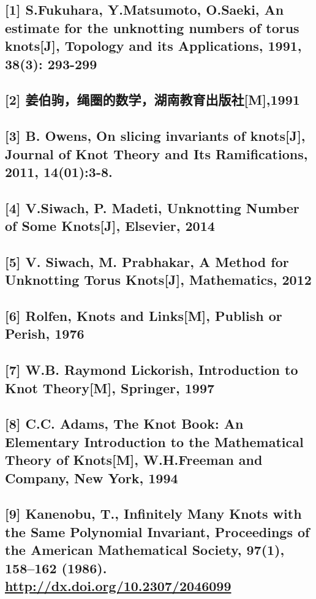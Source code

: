 \documentclass[a4paper]{article}
\begin{document}


\subsection{[1] S.Fukuhara, Y.Matsumoto, O.Saeki, An estimate for the unknotting numbers of torus knots[J], Topology and its Applications, 1991, 38(3): 293-299}
\label{sec:org12adf63}
\subsection{[2] 姜伯驹，绳圈的数学，湖南教育出版社[M],1991}
\label{sec:orgd600c18}
\subsection{[3] B. Owens, On slicing invariants of knots[J], Journal of Knot Theory and Its Ramifications, 2011, 14(01):3-8.}
\label{sec:orge9551ce}
\subsection{[4] V.Siwach, P. Madeti, Unknotting Number of Some Knots[J], Elsevier, 2014}
\label{sec:org68b4c78}
\subsection{[5] V. Siwach, M. Prabhakar, A Method for Unknotting Torus Knots[J], Mathematics, 2012}
\label{sec:org6aeaa2e}
\subsection{[6] Rolfen, Knots and Links[M], Publish or Perish, 1976}
\label{sec:orgc1c00f9}
\subsection{[7] W.B. Raymond Lickorish, Introduction to Knot Theory[M], Springer, 1997}
\label{sec:org495eaf6}
\subsection{[8] C.C. Adams, The Knot Book: An Elementary Introduction to the Mathematical Theory of Knots[M], W.H.Freeman and Company, New York, 1994}
\label{sec:org40f3425}
\subsection{[9] Kanenobu, T., Infinitely Many Knots with the Same Polynomial Invariant, Proceedings of the American Mathematical Society, 97(1), 158–162 (1986).  \url{http://dx.doi.org/10.2307/2046099}}
\label{sec:org567caae}

\cite{kanenobuInfinitelyManyKnots1986}
\end{document}
